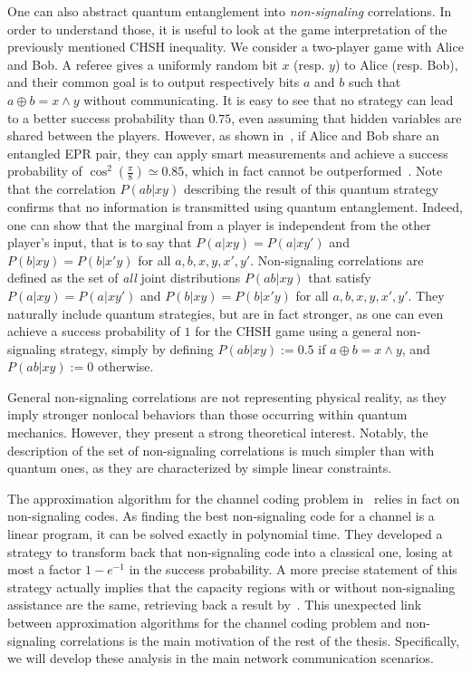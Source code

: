 One can also abstract quantum entanglement into \emph{non-signaling} correlations. In order to understand those, it is useful to look at the game interpretation of the previously mentioned CHSH inequality. We consider a two-player game with Alice and Bob. A referee gives a uniformly random bit $x$ (resp. $y$) to Alice (resp. Bob), and their common goal is to output respectively bits $a$ and $b$ such that $a \oplus b = x \land y$ without communicating. It is easy to see that no strategy can lead to a better success probability than $0.75$, even assuming that hidden variables are shared between the players. However, as shown in~\cite{CHSH69}, if Alice and Bob share an entangled EPR pair, they can apply smart measurements and achieve a success probability of $\cos^2\left(\frac{\pi}{8}\right) \simeq 0.85$, which in fact cannot be outperformed~\cite{Tsirelson80}. Note that the correlation $P(ab|xy)$ describing the result of this quantum strategy confirms that no information is transmitted using quantum entanglement. Indeed, one can show that the marginal from a player is independent from the other player's input, that is to say that $P(a|xy)=P(a|xy')$ and $P(b|xy)=P(b|x'y)$ for all $a,b,x,y,x',y'$. Non-signaling correlations are defined as the set of \emph{all} joint distributions $P(ab|xy)$ that satisfy $P(a|xy)=P(a|xy')$ and $P(b|xy)=P(b|x'y)$ for all $a,b,x,y,x',y'$. They naturally include quantum strategies, but are in fact stronger, as one can even achieve a success probability of $1$ for the CHSH game using a general non-signaling strategy, simply by defining $P(ab|xy):=0.5$ if $a \oplus b = x \land y$, and $P(ab|xy):=0$ otherwise.

General non-signaling correlations are not representing physical reality, as they imply stronger nonlocal behaviors than those occurring within quantum mechanics. However, they present a strong theoretical interest. Notably, the description of the set of non-signaling correlations is much simpler than with quantum ones, as they are characterized by simple linear constraints.

The approximation algorithm for the channel coding problem in~\cite{BF18} relies in fact on non-signaling codes. As finding the best non-signaling code for a channel is a linear program, it can be solved exactly in polynomial time. They developed a strategy to transform back that non-signaling code into a classical one, losing at most a factor $1-e^{-1}$ in the success probability. A more precise statement of this strategy actually implies that the capacity regions with or without non-signaling assistance are the same, retrieving back a result by~\cite{Matthews12}. This unexpected link between approximation algorithms for the channel coding problem and non-signaling correlations is the main motivation of the rest of the thesis. Specifically, we will develop these analysis in the main network communication scenarios.

